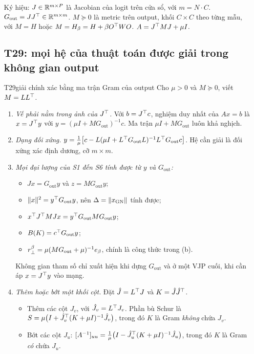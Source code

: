 Ký hiệu: $J\in\mathbb{R}^{m\times P}$ là Jacobian của logit trên cửa sổ, với $m=N\cdot C$. $G_{\mathrm{out}}=JJ^{\top}\in\mathbb{R}^{m\times m}$. $M\succeq0$ là metric trên output, khối $C\times C$ theo từng mẫu, với $M=H$ hoặc $M=H_\beta=H+\beta O^{\top} WO$. $A=J^{\top} MJ+\mu I$.

\subsection{T29: mọi hệ của thuật toán được giải trong không gian output}

\begin{namedthm}{T29}{giải chính xác bằng ma trận Gram của output}
Cho $\mu>0$ và $M\succeq0$, viết $M=LL^{\top}$.
\begin{enumerate}[label=(\alph*)]
\item \emph{Vế phải nằm trong ảnh của $J^{\top}$.} Với $b=J^{\top} c$, nghiệm duy nhất của $Ax=b$ là $x=J^{\top} y$ với $y=(\mu I+MG_{\mathrm{out}})^{-1}c$. Ma trận $\mu I+MG_{\mathrm{out}}$ luôn khả nghịch.
\item \emph{Dạng đối xứng.} $y=\tfrac1\mu\bigl[c-L(\mu I+L^{\top} G_{\mathrm{out}}L)^{-1}L^{\top} G_{\mathrm{out}}c\bigr]$. Hệ cần giải là đối xứng xác định dương, cỡ $m\times m$.
\item \emph{Mọi đại lượng của S1 đến S6 tính được từ $y$ và $G_{\mathrm{out}}$:}
\begin{itemize}
\item $Jx=G_{\mathrm{out}}y$ và $z=MG_{\mathrm{out}}y$;
\item $\lVert x\rVert^2=y^{\top} G_{\mathrm{out}}y$, nên $\Delta=\lVert x_{\mathrm{GN}}\rVert$ tính được;
\item $x^{\top} J^{\top} MJx=y^{\top} G_{\mathrm{out}}MG_{\mathrm{out}}y$;
\item $B(K)=c^{\top} G_{\mathrm{out}}y$;
\item $r_{\perp}^\beta=\mu(MG_{\mathrm{out}}+\mu)^{-1}e_\beta$, chính là công thức trong (b).
\end{itemize}
Không gian tham số chỉ xuất hiện khi dựng $G_{\mathrm{out}}$ và ở một VJP cuối, khi cần áp $x=J^{\top} y$ vào mạng.
\item \emph{Thêm hoặc bớt một khối cột.} Đặt $\hat J=L^{\top} J$ và $K=\hat J\hat J^{\top}$.
\begin{itemize}
\item Thêm các cột $J_v$, với $\hat J_v=L^{\top} J_v$. Phần bù Schur là $S=\mu\bigl(I+\hat J_v^{\top}(K+\mu I)^{-1}\hat J_v\bigr)$, trong đó $K$ là Gram \emph{không} chứa $J_v$.
\item Bớt các cột $J_u$: $[A^{-1}]_{uu}=\tfrac1\mu\bigl(I-\hat J_u^{\top}(K+\mu I)^{-1}\hat J_u\bigr)$, trong đó $K$ là Gram \emph{có} chứa $J_u$.

\end{itemize}
\end{enumerate}
\end{namedthm}

